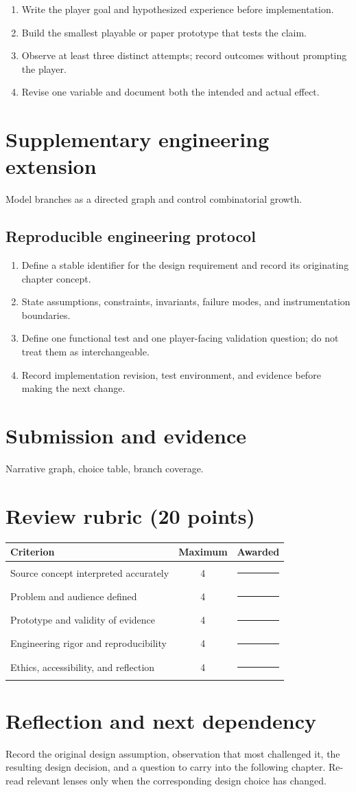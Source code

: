 \documentclass[11pt]{article}
\begin{document}
\begin{enumerate}
\item Write the player goal and hypothesized experience before implementation.
\item Build the smallest playable or paper prototype that tests the claim.
\item Observe at least three distinct attempts; record outcomes without prompting the player.
\item Revise one variable and document both the intended and actual effect.
\end{enumerate}

\section{Supplementary engineering extension}
Model branches as a directed graph and control combinatorial growth.


\subsection{Reproducible engineering protocol}
\begin{enumerate}
\item Define a stable identifier for the design requirement and record its originating chapter concept.
\item State assumptions, constraints, invariants, failure modes, and instrumentation boundaries.
\item Define one functional test and one player-facing validation question; do not treat them as interchangeable.
\item Record implementation revision, test environment, and evidence before making the next change.
\end{enumerate}

\section{Submission and evidence}
Narrative graph, choice table, branch coverage.


\section{Review rubric (20 points)}
\begin{tabularx}{\linewidth}{@{}Xcc@{}}\toprule
Criterion & Maximum & Awarded \\ \midrule
Source concept interpreted accurately & 4 & \rule{0.45in}{0.4pt}\\
Problem and audience defined & 4 & \rule{0.45in}{0.4pt}\\
Prototype and validity of evidence & 4 & \rule{0.45in}{0.4pt}\\
Engineering rigor and reproducibility & 4 & \rule{0.45in}{0.4pt}\\
Ethics, accessibility, and reflection & 4 & \rule{0.45in}{0.4pt}\\\bottomrule
\end{tabularx}

\section{Reflection and next dependency}
Record the original design assumption, observation that most challenged it, the resulting design decision, and a question to carry into the following chapter. Re-read relevant lenses only when the corresponding design choice has changed.
\end{document}
